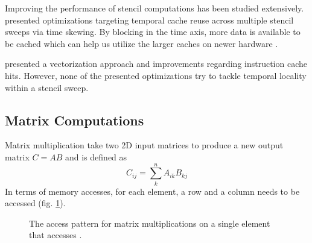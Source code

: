 \documentclass{article}
\begin{document}
Improving the performance of stencil computations has been studied extensively.
\citet{kamil2006implicit} presented optimizations targeting temporal cache reuse across multiple stencil sweeps via time skewing.
By blocking in the time axis, more data is available to be cached which can help us utilize the larger caches on newer hardware \cite{strzodka2011cache}.

\citet{zhao2019exploiting} presented a vectorization approach and improvements regarding instruction cache hits.
However, none of the presented optimizations try to tackle temporal locality within a stencil sweep.

\subsection{Matrix Computations}
\label{sec:matrix_intro}
Matrix multiplication take two 2D input matrices to produce a new output matrix $C = AB$ and is defined as
\[
    C_{ij} = \sum^n_k{A_{ik}B_{kj}}
\]
In terms of memory accesses, for each element, a row and a column needs to be accessed (fig. \ref{fig:matmult_access_pattern}).

\begin{figure}[h]
    \centering
    \qquad

    \caption{
        The access pattern for matrix multiplications on a single element  that accesses .
    }
    \label{fig:matmult_access_pattern}
\end{figure}
\end{document}
